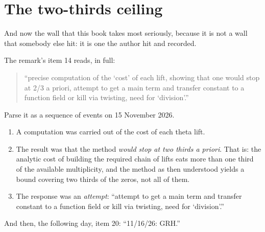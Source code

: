 \section{The two-thirds ceiling}And now the wall that this book takes most seriously, because it is not a wall
that somebody else hit: it is one the author hit and recorded.

The remark's item 14 reads, in full:

\begin{quote}
\small
``precise computation of the `cost' of each lift, showing that one would stop at
2/3 a priori, attempt to get a main term and transfer constant to a function
field or kill via twisting, need for `division'.''
\end{quote}

Parse it as a sequence of events on 15 November 2026.

\begin{enumerate}
\item A computation was carried out of the cost of each theta lift.
\item The result was that the method \emph{would stop at two thirds a priori}.
That is: the analytic cost of building the required chain of lifts eats more
than one third of the available multiplicity, and the method as then
understood yields a bound covering two thirds of the zeros, not all of them.
\item The response was an \emph{attempt}: ``attempt to get a main term and
transfer constant to a function field or kill via twisting, need for
`division'.''
\end{enumerate}

And then, the following day, item 20: ``11/16/26: GRH.''

